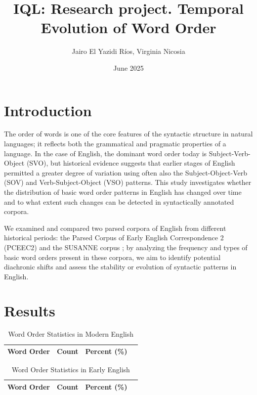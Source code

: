 \documentclass{article}
\title{IQL: Research project. Temporal Evolution of Word Order}
\author{Jairo El Yazidi Ríos, Virginia Nicosia}
\date{June 2025}
\begin{document}
\maketitle

\section{Introduction}

The order of words is one of the core features of the syntactic structure in natural languages; it reflects both the grammatical and pragmatic properties of a language. In the case of English, the dominant word order today is Subject-Verb-Object (SVO), but historical evidence suggests that earlier stages of English permitted a greater degree of variation using often also  the Subject-Object-Verb (SOV) and Verb-Subject-Object (VSO) patterns. This study investigates whether the distribution of basic word order patterns in English has changed over time and to what extent such changes can be detected in syntactically annotated corpora.

We examined and compared two parsed corpora of English from different historical periods: the Parsed Corpus of Early English Correspondence 2 (PCEEC2) \cite{PCEEC2} and the SUSANNE corpus \cite{SUSANNE}; by analyzing the frequency and types of basic word orders present in these corpora, we aim to identify potential diachronic shifts and assess the stability or evolution of syntactic patterns in English.

\section{Results}

\begin{table}[H]
    \centering
    \label{tab:susanne}
    \begin{tabular}{lrrr}
        \hline
        Word Order & Count & Percent (\%) \\
        \hline
        
    \end{tabular}
    \caption{Word Order Statistics in Modern English}
\end{table}

\begin{table}[H]
    \centering
    \label{tab:pceec}
    \begin{tabular}{lrrr}
        \hline
        Word Order & Count & Percent (\%) \\
        \hline
        
    \end{tabular}
    \caption{Word Order Statistics in Early English}
\end{table}
\end{document}
